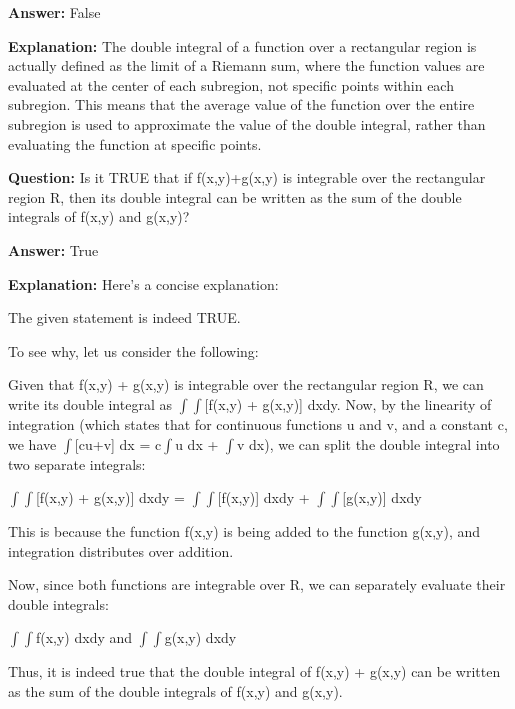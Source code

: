 \documentclass{article}
\begin{document}
                \textbf{Answer:} False

                \textbf{Explanation:} The double integral of a function over a rectangular region is actually defined as the limit of a Riemann sum, where the function values are evaluated at the center of each subregion, not specific points within each subregion. This means that the average value of the function over the entire subregion is used to approximate the value of the double integral, rather than evaluating the function at specific points.
                
                \vspace{0.5cm} 
        
            
                \textbf {Question:} Is it TRUE that if f(x,y)+g(x,y) is integrable over the rectangular region R, then its double integral can be written as the sum of the double integrals of f(x,y) and g(x,y)?
                
                \textbf{Answer:} True

                \textbf{Explanation:} Here's a concise explanation:

The given statement is indeed TRUE.

To see why, let us consider the following: 

Given that f(x,y) + g(x,y) is integrable over the rectangular region R, we can write its double integral as \ensuremath{\int}\ensuremath{\int}[f(x,y) + g(x,y)] dxdy. Now, by the linearity of integration (which states that for continuous functions u and v, and a constant c, we have \ensuremath{\int}[cu+v] dx = c\ensuremath{\int}u dx + \ensuremath{\int}v dx), we can split the double integral into two separate integrals: 

\ensuremath{\int}\ensuremath{\int}[f(x,y) + g(x,y)] dxdy = \ensuremath{\int}\ensuremath{\int}[f(x,y)] dxdy + \ensuremath{\int}\ensuremath{\int}[g(x,y)] dxdy

This is because the function f(x,y) is being added to the function g(x,y), and integration distributes over addition. 

Now, since both functions are integrable over R, we can separately evaluate their double integrals: 

\ensuremath{\int}\ensuremath{\int}f(x,y) dxdy and \ensuremath{\int}\ensuremath{\int}g(x,y) dxdy

Thus, it is indeed true that the double integral of f(x,y) + g(x,y) can be written as the sum of the double integrals of f(x,y) and g(x,y).
                
\end{document}
